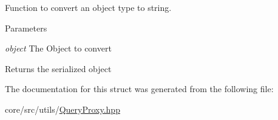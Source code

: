 Function to convert an object type to string. 


\begin{DoxyParams}{Parameters}
\item[{\em object}]The Object to convert \end{DoxyParams}
\begin{DoxyReturn}{Returns}
the serialized object 
\end{DoxyReturn}


The documentation for this struct was generated from the following file:\begin{DoxyCompactItemize}
\item 
core/src/utils/\hyperlink{QueryProxy_8hpp}{QueryProxy.hpp}\end{DoxyCompactItemize}
